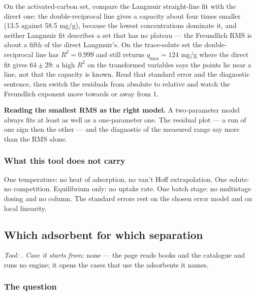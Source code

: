 \documentclass[11pt,a4paper]{article}
\begin{document}
\begin{tryit}
On the activated-carbon set, compare the Langmuir straight-line fit with the
direct one: the double-reciprocal line gives a capacity about four times
smaller (13.5 against 58.5 mg/g), because the lowest concentrations dominate
it, and neither Langmuir fit describes a set that has no plateau --- the
Freundlich RMS is about a fifth of the direct Langmuir's.  On the trace-solute set the
double-reciprocal line has $R^2 = 0.999$ and still returns $q_{\max} = 124$
mg/g where the direct fit gives $64 \pm 29$: a high $R^2$ on the transformed
variables says the points lie near a line, not that the capacity is known.
Read that standard error and the diagnostic sentence, then switch the
residuals from absolute to relative and watch the Freundlich exponent move
towards or away from 1.
\end{tryit}

\begin{pitfall}
\textbf{Reading the smallest RMS as the right model.}  A two-parameter
model always fits at least as well as a one-parameter one.  The residual
plot --- a run of one sign then the other --- and the diagnostic of the
measured range say more than the RMS alone.
\end{pitfall}

\subsubsection*{What this tool does not carry}

One temperature: no heat of adsorption, no van't Hoff extrapolation.  One
solute: no competition.  Equilibrium only: no uptake rate.  One batch
stage: no multistage dosing and no column.  The standard errors rest on the
chosen error model and on local linearity.

\subsection{Which adsorbent for which separation}\label{sec:edu-adsorbent-selection}


\noindent\textit{\small Tool:} .
\textit{\small Case it starts from:} none --- the page reads books and the
catalogue and runs no engine; it opens the cases that use the adsorbents it
names.

\subsubsection*{The question}
\end{document}
